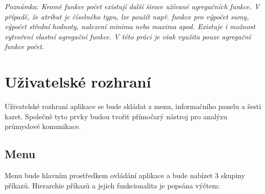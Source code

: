 \noindent \emph{Poznámka: Kromě funkce počet existují další široce užívané agregačních funkce. V případě, že atribut je číselného typu, lze použít např. funkce pro výpočet sumy, výpočet střední hodnoty, nalezení minima nebo maxima apod. Existuje i možnost vytvoření vlastní agregační funkce. V této práci je však využita pouze agregační funkce počet.}


\section{Uživatelské rozhraní}
\label{user_interface}

Uživatelské rozhraní aplikace se bude skládat z menu, informačního panelu a šesti karet. Společně tyto prvky budou tvořit přímočarý nástroj pro analýzu průmyslové komunikace.


\subsection*{Menu}

Menu bude hlavním prostředkem ovládání aplikace a bude nabízet 3 skupiny příkazů. Hierarchie příkazů a jejich funkcionalita je popsána výčtem:

